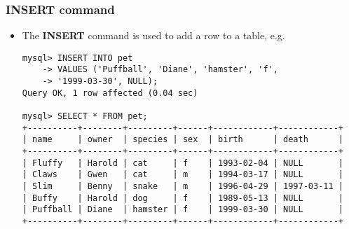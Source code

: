 \documentclass[hyperref={pdfpagelabels=false},svgnames,xcolor=table]{beamer}
\begin{document}
\begin{frame}[fragile]
  \frametitle{INSERT command}
  \begin{itemize}
    \item The \textbf{INSERT} command is used to add a row to a table, e.g.\ 
\begin{scriptsize}
\begin{verbatim}
mysql> INSERT INTO pet
    -> VALUES ('Puffball', 'Diane', 'hamster', 'f', 
    -> '1999-03-30', NULL);
Query OK, 1 row affected (0.04 sec)

mysql> SELECT * FROM pet;
+----------+--------+---------+------+------------+------------+
| name     | owner  | species | sex  | birth      | death      |
+----------+--------+---------+------+------------+------------+
| Fluffy   | Harold | cat     | f    | 1993-02-04 | NULL       |
| Claws    | Gwen   | cat     | m    | 1994-03-17 | NULL       |
| Slim     | Benny  | snake   | m    | 1996-04-29 | 1997-03-11 |
| Buffy    | Harold | dog     | f    | 1989-05-13 | NULL       |
| Puffball | Diane  | hamster | f    | 1999-03-30 | NULL       |
+----------+--------+---------+------+------------+------------+
\end{verbatim}
\end{scriptsize}
  \end{itemize}
\end{frame}
\end{document}
